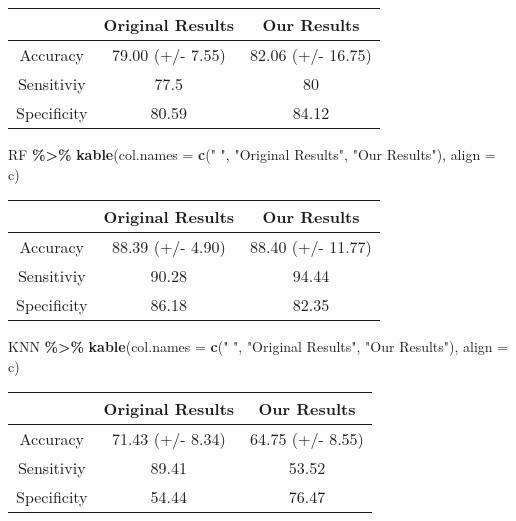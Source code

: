\documentclass[
]{article}
\newenvironment{Shaded}{\begin{snugshade}}{\end{snugshade}}
\newcommand{\AttributeTok}[1]{\textcolor[rgb]{0.13,0.29,0.53}{#1}}
\newcommand{\FunctionTok}[1]{\textcolor[rgb]{0.13,0.29,0.53}{\textbf{#1}}}
\newcommand{\NormalTok}[1]{#1}
\newcommand{\SpecialCharTok}[1]{\textcolor[rgb]{0.81,0.36,0.00}{\textbf{#1}}}
\newcommand{\StringTok}[1]{\textcolor[rgb]{0.31,0.60,0.02}{#1}}
\begin{document}
\begin{longtable}[]{@{}ccc@{}}
\toprule\noalign{}
& Original Results & Our Results \\
\midrule\noalign{}
\endhead
\bottomrule\noalign{}
\endlastfoot
Accuracy & 79.00 (+/- 7.55) & 82.06 (+/- 16.75) \\
Sensitiviy & 77.5 & 80 \\
Specificity & 80.59 & 84.12 \\
\end{longtable}

\begin{Shaded}
\begin{Highlighting}[]
\NormalTok{RF }\SpecialCharTok{\%\textgreater{}\%}
  \FunctionTok{kable}\NormalTok{(}\AttributeTok{col.names =} \FunctionTok{c}\NormalTok{(}\StringTok{" "}\NormalTok{, }\StringTok{"Original Results"}\NormalTok{, }\StringTok{"Our Results"}\NormalTok{), }\AttributeTok{align =} \StringTok{\textquotesingle{}c\textquotesingle{}}\NormalTok{)}
\end{Highlighting}
\end{Shaded}

\begin{longtable}[]{@{}ccc@{}}
\toprule\noalign{}
& Original Results & Our Results \\
\midrule\noalign{}
\endhead
\bottomrule\noalign{}
\endlastfoot
Accuracy & 88.39 (+/- 4.90) & 88.40 (+/- 11.77) \\
Sensitiviy & 90.28 & 94.44 \\
Specificity & 86.18 & 82.35 \\
\end{longtable}

\begin{Shaded}
\begin{Highlighting}[]
\NormalTok{KNN }\SpecialCharTok{\%\textgreater{}\%}
  \FunctionTok{kable}\NormalTok{(}\AttributeTok{col.names =} \FunctionTok{c}\NormalTok{(}\StringTok{" "}\NormalTok{, }\StringTok{"Original Results"}\NormalTok{, }\StringTok{"Our Results"}\NormalTok{), }\AttributeTok{align =} \StringTok{\textquotesingle{}c\textquotesingle{}}\NormalTok{)}
\end{Highlighting}
\end{Shaded}

\begin{longtable}[]{@{}ccc@{}}
\toprule\noalign{}
& Original Results & Our Results \\
\midrule\noalign{}
\endhead
\bottomrule\noalign{}
\endlastfoot
Accuracy & 71.43 (+/- 8.34) & 64.75 (+/- 8.55) \\
Sensitiviy & 89.41 & 53.52 \\
Specificity & 54.44 & 76.47 \\
\end{longtable}
\end{document}
